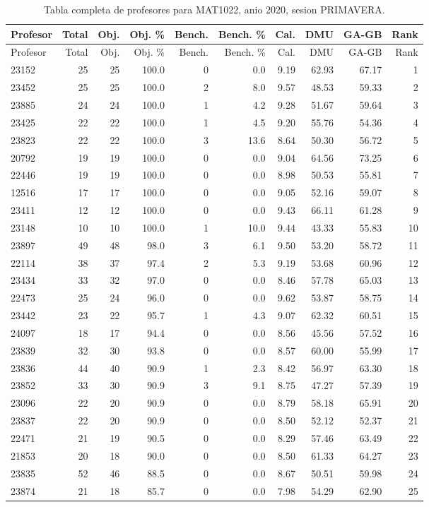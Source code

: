 \begingroup
\scriptsize
\setlength{\tabcolsep}{3pt}
\begin{longtable}{lrrrrrrrrr}
\caption{Tabla completa de profesores para MAT1022, anio 2020, sesion PRIMAVERA.}\label{tab:prof-period-mat1022-2020-primavera-especializado}\\
\toprule
Profesor & Total & Obj. & Obj. \% & Bench. & Bench. \% & Cal. & DMU & GA-GB & Rank \\
\midrule
\endfirsthead
\toprule
Profesor & Total & Obj. & Obj. \% & Bench. & Bench. \% & Cal. & DMU & GA-GB & Rank \\
\midrule
\endhead
23152 & 25 & 25 & 100.0 & 0 & 0.0 & 9.19 & 62.93 & 67.17 & 1 \\
23452 & 25 & 25 & 100.0 & 2 & 8.0 & 9.57 & 48.53 & 59.33 & 2 \\
23885 & 24 & 24 & 100.0 & 1 & 4.2 & 9.28 & 51.67 & 59.64 & 3 \\
23425 & 22 & 22 & 100.0 & 1 & 4.5 & 9.20 & 55.76 & 54.36 & 4 \\
23823 & 22 & 22 & 100.0 & 3 & 13.6 & 8.64 & 50.30 & 56.72 & 5 \\
20792 & 19 & 19 & 100.0 & 0 & 0.0 & 9.04 & 64.56 & 73.25 & 6 \\
22446 & 19 & 19 & 100.0 & 0 & 0.0 & 8.98 & 50.53 & 55.81 & 7 \\
12516 & 17 & 17 & 100.0 & 0 & 0.0 & 9.05 & 52.16 & 59.07 & 8 \\
23411 & 12 & 12 & 100.0 & 0 & 0.0 & 9.43 & 66.11 & 61.28 & 9 \\
23148 & 10 & 10 & 100.0 & 1 & 10.0 & 9.44 & 43.33 & 55.83 & 10 \\
23897 & 49 & 48 & 98.0 & 3 & 6.1 & 9.50 & 53.20 & 58.72 & 11 \\
22114 & 38 & 37 & 97.4 & 2 & 5.3 & 9.19 & 53.68 & 60.96 & 12 \\
23434 & 33 & 32 & 97.0 & 0 & 0.0 & 8.46 & 57.78 & 65.03 & 13 \\
22473 & 25 & 24 & 96.0 & 0 & 0.0 & 9.62 & 53.87 & 58.75 & 14 \\
23442 & 23 & 22 & 95.7 & 1 & 4.3 & 9.07 & 62.32 & 60.51 & 15 \\
24097 & 18 & 17 & 94.4 & 0 & 0.0 & 8.56 & 45.56 & 57.52 & 16 \\
23839 & 32 & 30 & 93.8 & 0 & 0.0 & 8.57 & 60.00 & 55.99 & 17 \\
23836 & 44 & 40 & 90.9 & 1 & 2.3 & 8.42 & 56.97 & 63.30 & 18 \\
23852 & 33 & 30 & 90.9 & 3 & 9.1 & 8.75 & 47.27 & 57.39 & 19 \\
23096 & 22 & 20 & 90.9 & 0 & 0.0 & 8.79 & 58.18 & 65.91 & 20 \\
23837 & 22 & 20 & 90.9 & 0 & 0.0 & 8.50 & 52.12 & 52.37 & 21 \\
22471 & 21 & 19 & 90.5 & 0 & 0.0 & 8.29 & 57.46 & 63.49 & 22 \\
21853 & 20 & 18 & 90.0 & 0 & 0.0 & 8.50 & 61.33 & 64.27 & 23 \\
23835 & 52 & 46 & 88.5 & 0 & 0.0 & 8.67 & 50.51 & 59.98 & 24 \\
23874 & 21 & 18 & 85.7 & 0 & 0.0 & 7.98 & 54.29 & 62.90 & 25 \\
\bottomrule
\end{longtable}
\endgroup

